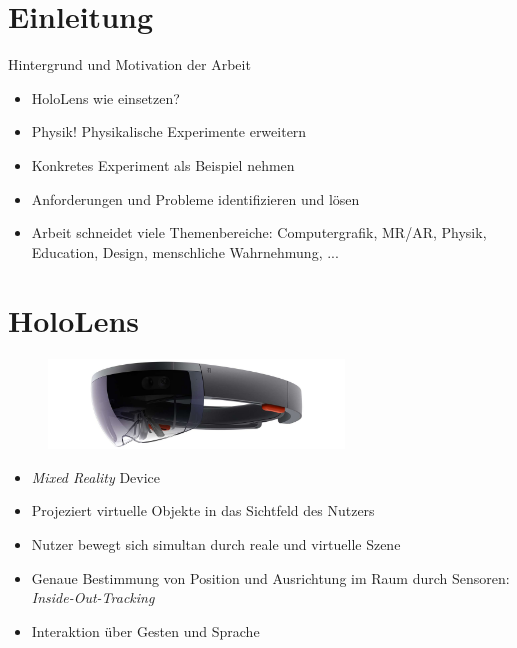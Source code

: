 \part{Einleitung}
\label{part:intro}

\begin{frame}[fragile]{Hintergrund und Motivation der Arbeit}
\begin{itemize}
	\item HoloLens wie einsetzen?
	\pause
	\item Physik! Physikalische Experimente erweitern
	\pause
	\item Konkretes Experiment als Beispiel nehmen
	\item Anforderungen und Probleme identifizieren und lösen
	\pause
	\item Arbeit schneidet viele Themenbereiche: Computergrafik, MR/AR, Physik, Education, Design, menschliche Wahrnehmung, ... 
\end{itemize}
 
\end{frame}

\part{HoloLens}
\label{part:hololens}
\begin{frame}[fragile]{}
\begin{figure}[h!]
	\centering
	\includegraphics[width=0.7\textwidth]{images/hololens.jpg}
\end{figure}
\begin{itemize}
	\pause
	\item \textit{Mixed Reality} Device
	\pause
	\item Projeziert virtuelle Objekte in das Sichtfeld des Nutzers
	\pause
	\item Nutzer bewegt sich simultan durch reale und virtuelle Szene
	\pause
	\item Genaue Bestimmung von Position und Ausrichtung im Raum durch Sensoren: \textit{Inside-Out-Tracking}
	\pause
	\item Interaktion über Gesten und Sprache
\end{itemize}	
\end{frame}

